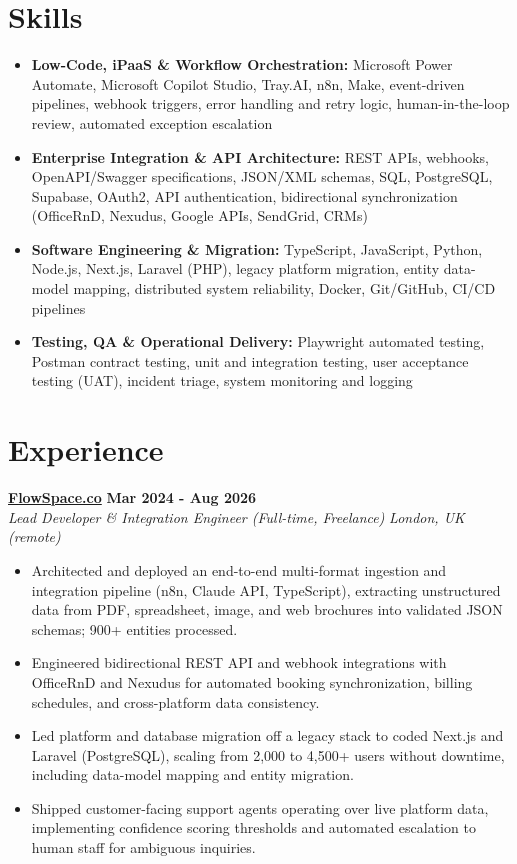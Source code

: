 \documentclass[a4paper,10pt]{article}
\newcommand{\role}[4]{%
  \textbf{#1} \hfill \textbf{#2}\\[1pt]%
  \textit{#3} \hfill \textit{#4}\\[2pt]%
}
\begin{document}
\section{Skills}
\begin{itemize}
  \item \textbf{Low-Code, iPaaS \& Workflow Orchestration:} Microsoft Power Automate, Microsoft Copilot Studio, Tray.AI, n8n, Make, event-driven pipelines, webhook triggers, error handling and retry logic, human-in-the-loop review, automated exception escalation
  \item \textbf{Enterprise Integration \& API Architecture:} REST APIs, webhooks, OpenAPI/Swagger specifications, JSON/XML schemas, SQL, PostgreSQL, Supabase, OAuth2, API authentication, bidirectional synchronization (OfficeRnD, Nexudus, Google APIs, SendGrid, CRMs)
  \item \textbf{Software Engineering \& Migration:} TypeScript, JavaScript, Python, Node.js, Next.js, Laravel (PHP), legacy platform migration, entity data-model mapping, distributed system reliability, Docker, Git/GitHub, CI/CD pipelines
  \item \textbf{Testing, QA \& Operational Delivery:} Playwright automated testing, Postman contract testing, unit and integration testing, user acceptance testing (UAT), incident triage, system monitoring and logging
\end{itemize}

\section{Experience}

\role{\href{https://flowspace.co}{FlowSpace.co}}{Mar 2024 - Aug 2026}{Lead Developer \& Integration Engineer (Full-time, Freelance)}{London, UK (remote)}
\begin{itemize}
  \item Architected and deployed an end-to-end multi-format ingestion and integration pipeline (n8n, Claude API, TypeScript), extracting unstructured data from PDF, spreadsheet, image, and web brochures into validated JSON schemas; 900+ entities processed.
  \item Engineered bidirectional REST API and webhook integrations with OfficeRnD and Nexudus for automated booking synchronization, billing schedules, and cross-platform data consistency.
  \item Led platform and database migration off a legacy stack to coded Next.js and Laravel (PostgreSQL), scaling from 2,000 to 4,500+ users without downtime, including data-model mapping and entity migration.
  \item Shipped customer-facing support agents operating over live platform data, implementing confidence scoring thresholds and automated escalation to human staff for ambiguous inquiries.
\end{itemize}
\end{document}
